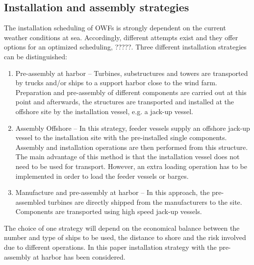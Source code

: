 \subsection{Installation and assembly strategies}
The installation scheduling of OWFs is strongly dependent on the current weather conditions at sea. Accordingly, different attempts exist and they offer options for an optimized scheduling, ?????. Three different installation strategies can be distinguished:

\begin{enumerate}
\item Pre-assembly at harbor -- Turbines, substructures and towers are transported by trucks and/or ships to a support harbor close to the wind farm. Preparation and pre-assembly of different components are carried out at this point and afterwards, the structures are transported and installed at the offshore site by the installation vessel, e.g. a jack-up vessel.
\item Assembly Offshore -- In this strategy, feeder vessels supply an offshore jack-up vessel to the installation site with the pre-installed single components. Assembly and installation operations are then performed from this structure. The main advantage of this method is that the installation vessel does not need to be used for transport. However, an extra loading operation has to be implemented in order to load the feeder vessels or barges.
\item Manufacture and pre-assembly at harbor -- In this approach, the pre-assembled turbines are directly shipped from the manufacturers to the site. Components are transported using high speed jack-up vessels.
\end{enumerate}

The choice of one strategy will depend on the economical balance between the number and type of ships to be used, the distance to shore and the risk involved due to different operations. In this paper installation strategy with the pre-assembly at harbor has been considered.